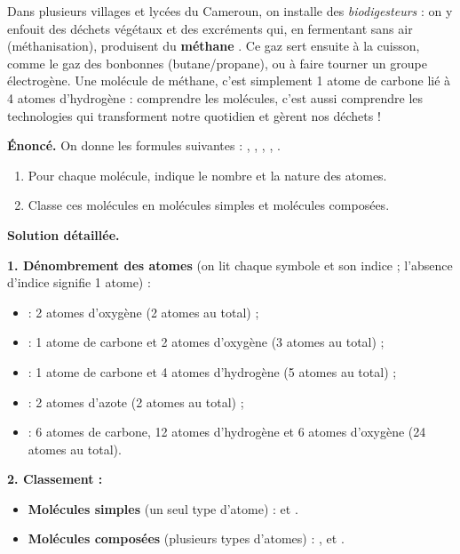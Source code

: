 \documentclass[11pt]{article}
\begin{document}
\begin{savaistu}
Dans plusieurs villages et lycées du Cameroun, on installe des \emph{biodigesteurs} : on y enfouit des déchets végétaux et des excréments qui, en fermentant sans air (méthanisation), produisent du \textbf{méthane} . Ce gaz sert ensuite à la cuisson, comme le gaz des bonbonnes (butane/propane), ou à faire tourner un groupe électrogène. Une molécule de méthane, c'est simplement 1 atome de carbone lié à 4 atomes d'hydrogène : comprendre les molécules, c'est aussi comprendre les technologies qui transforment notre quotidien et gèrent nos déchets !
\end{savaistu}

\begin{exoresolu}
\textbf{Énoncé.} On donne les formules suivantes : , , , , .
\begin{enumerate}
\item Pour chaque molécule, indique le nombre et la nature des atomes.
\item Classe ces molécules en molécules simples et molécules composées.
\end{enumerate}
\tcblower
\textbf{Solution détaillée.}

\textbf{1. Dénombrement des atomes} (on lit chaque symbole et son indice ; l'absence d'indice signifie 1 atome) :
\begin{itemize}
\item {} : 2 atomes d'oxygène (2 atomes au total) ;
\item {} : 1 atome de carbone et 2 atomes d'oxygène (3 atomes au total) ;
\item {} : 1 atome de carbone et 4 atomes d'hydrogène (5 atomes au total) ;
\item {} : 2 atomes d'azote (2 atomes au total) ;
\item {} : 6 atomes de carbone, 12 atomes d'hydrogène et 6 atomes d'oxygène (24 atomes au total).
\end{itemize}

\textbf{2. Classement :}
\begin{itemize}
\item \textbf{Molécules simples} (un seul type d'atome) :  et .
\item \textbf{Molécules composées} (plusieurs types d'atomes) : ,  et .
\end{itemize}
\end{exoresolu}
\end{document}
